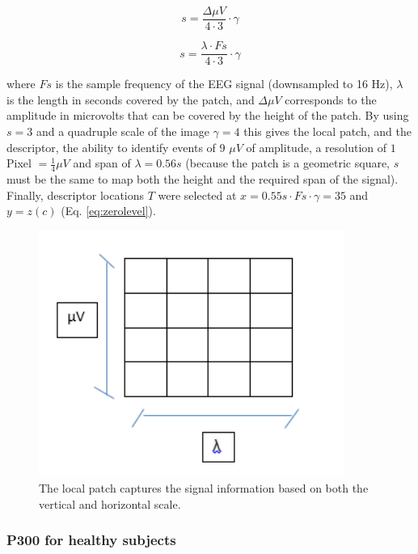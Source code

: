 \documentclass[entropy,article,submit,moreauthors,pdftex,10pt,a4paper]{mdpi}
\begin{document}
\begin{equation}
s= \frac{\Delta \mu V}{4 \cdot 3} \cdot \gamma 
\label{eq:mapping1}
\end{equation}

\begin{equation}
s = \frac{\lambda \cdot Fs}{4 \cdot 3} \cdot \gamma
\label{eq:mapping2}
\end{equation}

\noindent where $ Fs $ is the sample frequency of the EEG signal (downsampled to 16 Hz), $ \lambda $ is the length in seconds covered by the patch, and $\Delta  \mu V $ corresponds to the amplitude in microvolts that can be covered by the height of the patch. By using $ s = 3 $ and a quadruple scale of the image $ \gamma = 4 $ this gives the local patch, and the descriptor, the ability to identify events of 9 $ \mu V $ of amplitude, a resolution of $ 1 $ Pixel $ = \frac{1}{4} \mu V $ and span   of $ \lambda = 0.56 s $ (because the patch is a geometric square, $ s $ must be the same to map both the height and the required span of the signal).  Finally, descriptor locations $ T $ were selected at $ x =  0.55 s \cdot Fs \cdot \gamma = 35 $ and $ y = z(c) $ (Eq. \ref{eq:zerolevel}).

\begin{figure}[H]
\centering
\includegraphics[width=10cm]{localpatch.png}
\caption{The local patch captures the signal information based on both the vertical and horizontal scale.}
\label{fig:sampledescriptor2}
\end{figure}

\subsubsection{P300 for healthy subjects}
\end{document}

